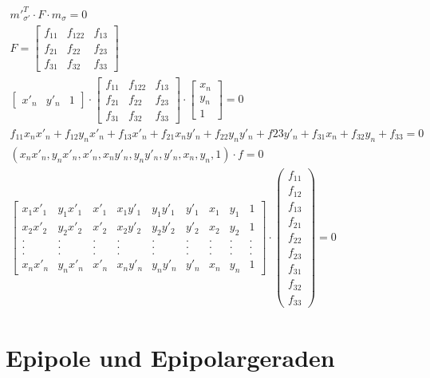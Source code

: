 \begin{gather}
{m'}_{\sigma'}^T \cdot F \cdot m_\sigma =0\\
F=\begin{bmatrix}
f_{11}&f_{122}&f_{13}\\
f_{21}&f_{22}&f_{23}\\
f_{31}&f_{32}&f_{33}
\end{bmatrix}\\
\begin{bmatrix}
x'_n&y'_n&1
\end{bmatrix} 
\cdot
\begin{bmatrix}
f_{11}&f_{122}&f_{13}\\
f_{21}&f_{22}&f_{23}\\
f_{31}&f_{32}&f_{33}
\end{bmatrix}
\cdot
\begin{bmatrix}
x_n\\y_n\\1
\end{bmatrix} =0\\
f_{11}x_nx'_n+f_{12}y_nx'_n+f_{13}x'_n+f_{21}x_ny'_n+f_{22}y_ny'_n+f{23}y'_n+f_{31}x_n+f_{32}y_n+f_{33} =0\\
(x_nx'_n,y_nx'_n,x'_n,x_ny'_n,y_ny'_n,y'_n,x_n,y_n,1)\cdot f =0\\
\begin{bmatrix}
x_1x'_1&y_1x'_1&x'_1&x_1y'_1&y_1y'_1&y'_1&x_1&y_1&1\\
x_2x'_2&y_2x'_2&x'_2&x_2y'_2&y_2y'_2&y'_2&x_2&y_2&1\\
.&.&.&.&.&.&.&.&.\\
.&.&.&.&.&.&.&.&.\\
.&.&.&.&.&.&.&.&.\\
x_nx'_n&y_nx'_n&x'_n&x_ny'_n&y_ny'_n&y'_n&x_n&y_n&1
\end{bmatrix}
\cdot 
\begin{pmatrix}
f_{11}\\f_{12}\\f_{13}\\f_{21}\\f_{22}\\f_{23}\\f_{31}\\f_{32}\\f_{33}
\end{pmatrix}
= 0
\end{gather}


\section{Epipole und Epipolargeraden}

